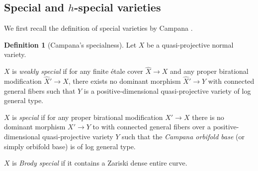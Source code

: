 \documentclass[english]{amsproc}
\theoremstyle{plain}
\theoremstyle{definition}
\newtheorem{dfn}[thm]{Definition}
\theoremstyle{remark}
\theoremstyle{plain}
\numberwithin{equation}{thm} %
\begin{document}
	\subsection{Special and $h$-special varieties}
	We first recall the definition of special varieties by Campana \cite{Cam04,Cam11}.
	\begin{dfn}[Campana's specialness]\label{def:special}
		Let $X$ be a    quasi-projective normal variety.
		\begin{thmlist}
			\item	$X$ is \emph{weakly special} if for any finite \'etale cover $\widehat{X}\to X$ and any proper birational modification $\widehat{X}'\to \widehat{X}$, there exists no  dominant morphism  $\widehat{X}'\to Y$  with connected general fibers such that $Y$ is a positive-dimensional  quasi-projective  variety of  log  general type.  
			\item  $X$ is \emph{special} if  for  any proper birational modification $X'\to X$ there is no dominant morphism $X'\to  Y$  to with connected general fibers over  a positive-dimensional  quasi-projective  variety  $Y$ such that the \emph{Campana orbifold base}  (or simply orbifold base) is  of log  general type.  
			\item $X$ is \emph{Brody special} if  it contains a Zariski dense entire curve. 
		\end{thmlist}
	\end{dfn}
	
\end{document}
